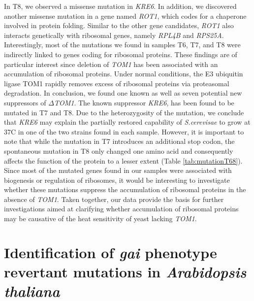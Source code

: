 \documentclass[10pt,a4paper]{article}
\begin{document}
\noindent In T8, we observed a missense mutation in \textit{KRE6}. In addition, we discovered another missense mutation in a gene named \textit{ROT1}, which codes for a chaperone involved in protein folding\cite{takeuchi_saccharomyces_2008}. Similar to the other gene candidates, \textit{ROT1} also interacts genetically with ribosomal genes, namely \textit{RPL4B} and \textit{RPS25A}.\\
 
\noindent Interestingly, most of the mutations we found in samples T6, T7, and T8 were indirectly linked to genes coding for ribosomal proteins. These findings are of particular interest since deletion of \textit{TOM1} has been associated with an accumulation of ribosomal proteins. Under normal conditions, the E3 ubiquitin ligase TOM1 rapidly removes excess of ribosomal proteins via proteasomal degradation\cite{sung_conserved_2016}. In conclusion, we found one known as well as seven potential new suppressors of \textit{$\Delta$TOM1}. The known suppressor \textit{KRE6}, has been found to be mutated in T7 and T8. Due to the heterozygosity of the mutation, we conclude that \textit{KRE6} may explain the partially restored capability of \textit{S.cerevisae} to grow at 37\degree C in one of the two strains found in each sample. However, it is important to note that while the mutation in T7 introduces an additional stop codon, the spontaneous mutation in T8 only changed one amino acid and consequently affects the function of the protein to a lesser extent (Table \ref{tab:mutationT68})\cite{sasaki_extragenic_2000}. Since most of the mutated genes found in our samples were associated with biogenesis or regulation of ribosomes, it would be interesting to investigate whether these mutations suppress the accumulation of ribosomal proteins in the absence of \textit{TOM1}. Taken together, our data provide the basis for further investigations aimed at clarifying whether accumulation of ribosomal proteins may be causative of the heat sensitivity of yeast lacking \textit{TOM1}.
 
 
 
 
 
 









\newpage
\part*{\Large Identification of \textit{gai} phenotype revertant mutations in \textit{Arabidopsis thaliana}}
\end{document}
